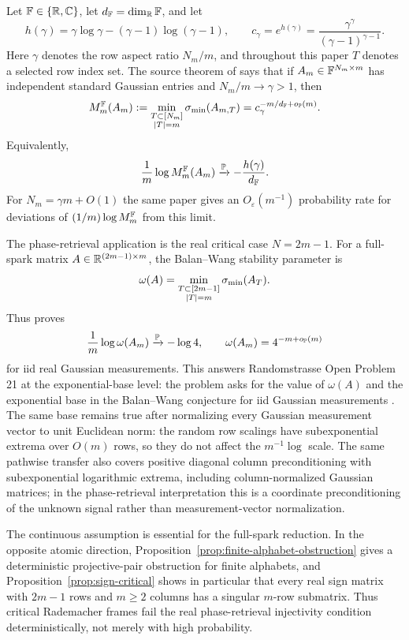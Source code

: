 Let \(\mathbb{F}\in\{\mathbb{R},\mathbb{C}\}\), let \(d_{\mathbb{F}}=\dim_{\mathbb{R}} \mathbb{F}\), and let
\[
  h(\gamma)=\gamma\log\gamma-(\gamma-1)\log(\gamma-1),
  \qquad
  c_\gamma=e^{h(\gamma)}=\frac{\gamma^\gamma}{(\gamma-1)^{\gamma-1}}.
\]
Here \(\gamma\) denotes the row aspect ratio \(N_m/m\), and throughout this paper
\(T\) denotes a selected row index set.
The source theorem of \cite{ShmaloExtremal2026} says that if
\(A_m\in\mathbb{F}^{N_m\times m}\) has independent standard Gaussian entries and
\(N_m/m\to\gamma>1\), then
\[
  M_m^{\mathbb{F}}(A_m):=\min_{\substack{T\subset[N_m]\\ |T|=m}}\sigma_{\min}(A_{m,T})
  =c_\gamma^{-m/d_{\mathbb{F}}+o_{\mathbb{P}}(m)}.
\]
Equivalently,
\[
  \frac{1}{m}\log M_m^{\mathbb{F}}(A_m)\xrightarrow{\mathbb{P}}-\frac{h(\gamma)}{d_{\mathbb{F}}}.
\]
For \(N_m=\gamma m+O(1)\) the same paper gives an \(O_\varepsilon(m^{-1})\)
probability rate for deviations of \((1/m)\log M_m^{\mathbb{F}}\) from this limit.

The phase-retrieval application is the real critical case \(N=2m-1\).  For a
full-spark matrix \(A\in\mathbb{R}^{(2m-1)\times m}\), the Balan--Wang stability
parameter \cite{BalanCasazzaEdidin2006,BalanWang2015,BandeiraCahillMixonNelson2014} is
\[
  \omega(A)=
  \min_{\substack{T\subset[2m-1]\\ |T|=m}}\sigma_{\min}(A_T).
\]
Thus \cite{ShmaloExtremal2026} proves
\[
  \frac{1}{m}\log\omega(A_m)\xrightarrow{\mathbb{P}}-\log 4,
  \qquad
  \omega(A_m)=4^{-m+o_{\mathbb{P}}(m)}
\]
for iid real Gaussian measurements.  This answers Randomstrasse Open Problem
21 at the exponential-base level: the problem asks for the value of
\(\omega(A)\) and the exponential base in the Balan--Wang conjecture for iid
Gaussian measurements \cite{BandeiraStablePhase}.
The same base remains true after normalizing every Gaussian measurement vector
to unit Euclidean norm: the random row scalings have subexponential extrema
over \(O(m)\) rows, so they do not affect the \(m^{-1}\log\) scale.  The same
pathwise transfer also covers positive diagonal column preconditioning with
subexponential logarithmic extrema, including column-normalized Gaussian matrices;
in the phase-retrieval interpretation this is a coordinate preconditioning of
the unknown signal rather than measurement-vector normalization.

The continuous assumption is essential for the full-spark reduction.  In the
opposite atomic direction, Proposition~\ref{prop:finite-alphabet-obstruction}
gives a deterministic projective-pair obstruction for finite alphabets, and
Proposition~\ref{prop:sign-critical} shows in particular that
every real sign matrix with \(2m-1\) rows and \(m\ge2\) columns has a singular
\(m\)-row submatrix.  Thus critical Rademacher frames fail the real
phase-retrieval injectivity condition deterministically, not merely with high
probability.

